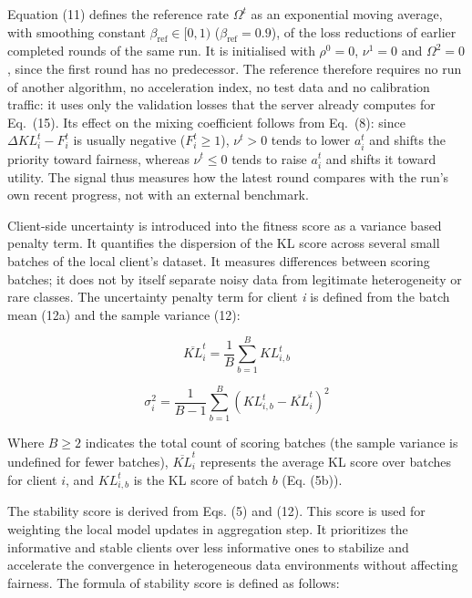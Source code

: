 \documentclass[pdflatex,sn-mathphys-num,oneside]{sn-jnl}%
\theoremstyle{thmstyleone}%
\theoremstyle{thmstyletwo}%
\theoremstyle{thmstylethree}%
\begin{document}
Equation (11) defines the reference rate $\Omega^t$ as an exponential moving average, with smoothing constant $\beta_{\text{ref}}\in[0,1)$ ($\beta_{\text{ref}}=0.9$), of the loss reductions of earlier completed rounds of the same run. It is initialised with $\rho^{0}=0$, $\nu^{1}=0$ and $\Omega^{2}=0$, since the first round has no predecessor. The reference therefore requires no run of another algorithm, no acceleration index, no test data and no calibration traffic: it uses only the validation losses that the server already computes for Eq.~(15). Its effect on the mixing coefficient follows from Eq.~(8): since $\Delta KL_i^t - F_i^t$ is usually negative ($F_i^t\ge 1$), $\nu^t>0$ tends to lower $a_i^t$ and shifts the priority toward fairness, whereas $\nu^t\le 0$ tends to raise $a_i^t$ and shifts it toward utility. The signal thus measures how the latest round compares with the run's own recent progress, not with an external benchmark.

Client-side uncertainty is introduced into the fitness score as a variance based penalty term. It quantifies the dispersion of the KL score across several small batches of the local client's dataset. It measures differences between scoring batches; it does not by itself separate noisy data from legitimate heterogeneity or rare classes. The uncertainty penalty term for client \textit{i} is defined from the batch mean (12a) and the sample variance (12):

\begin{equation}
\overline{KL}_i^t = \frac{1}{B}\sum_{b=1}^{B} KL_{i,b}^t
\tag{12a}
\end{equation}

\begin{equation}
\sigma_i^2 = \frac{1}{B-1} \sum_{b=1}^{B} \left( KL_{i,b}^t - \overline{KL}_i^t \right)^2
\label{eq:variance}
\end{equation}

Where $B\ge 2$ indicates the total count of scoring batches (the sample variance is undefined for fewer batches), $\overline{KL}_i^t$ represents the average KL score over batches for client $i$, and $KL_{i,b}^t$ is the KL score of batch $b$ (Eq. (5b)).

The stability score is derived from Eqs. (5) and (12). This score is used for weighting the local model updates in aggregation step. It prioritizes the informative and stable clients over less informative ones to stabilize and accelerate the convergence in heterogeneous data environments without affecting fairness. The formula of stability score is defined as follows:
\end{document}
